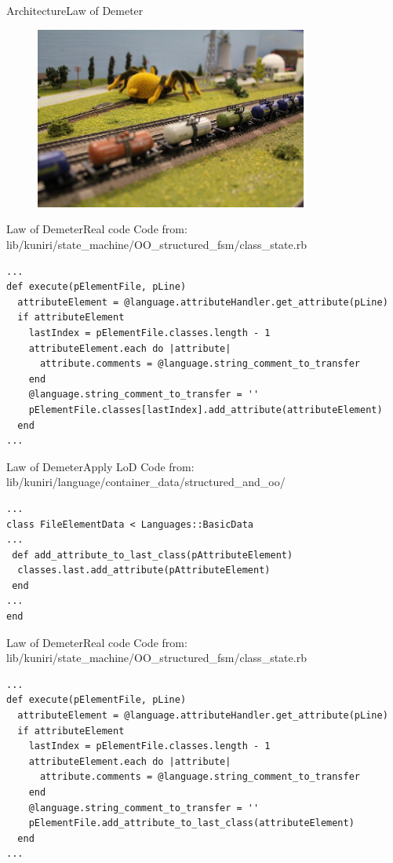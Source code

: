 \documentclass[10pt]{beamer}
\begin{document}
\begin{frame}{Architecture}{Law of Demeter}
  \begin{figure}[Look at class structure]
    \includegraphics[width=0.8\textwidth]{images/demeter_train.jpg}
  \end{figure}
\end{frame}

\begin{frame}[fragile]{Law of Demeter}{Real code}
Code from: lib/kuniri/state\_machine/OO\_structured\_fsm/class\_state.rb
\small
\begin{lstlisting}
...
def execute(pElementFile, pLine)
  attributeElement = @language.attributeHandler.get_attribute(pLine)
  if attributeElement
    lastIndex = pElementFile.classes.length - 1
    attributeElement.each do |attribute|
      attribute.comments = @language.string_comment_to_transfer
    end
    @language.string_comment_to_transfer = ''
    pElementFile.classes[lastIndex].add_attribute(attributeElement)
  end
...
\end{lstlisting}
\end{frame}

\begin{frame}[fragile]{Law of Demeter}{Apply LoD}
Code from:
lib/kuniri/language/container\_data/structured\_and\_oo/
\small
\begin{lstlisting}
...
class FileElementData < Languages::BasicData
...
 def add_attribute_to_last_class(pAttributeElement)
  classes.last.add_attribute(pAttributeElement)
 end
...
end
\end{lstlisting}
\end{frame}

\begin{frame}[fragile]{Law of Demeter}{Real code}
Code from: lib/kuniri/state\_machine/OO\_structured\_fsm/class\_state.rb
\small
\begin{lstlisting}
...
def execute(pElementFile, pLine)
  attributeElement = @language.attributeHandler.get_attribute(pLine)
  if attributeElement
    lastIndex = pElementFile.classes.length - 1
    attributeElement.each do |attribute|
      attribute.comments = @language.string_comment_to_transfer
    end
    @language.string_comment_to_transfer = ''
    pElementFile.add_attribute_to_last_class(attributeElement)
  end
...
\end{lstlisting}
\end{frame}
\end{document}
